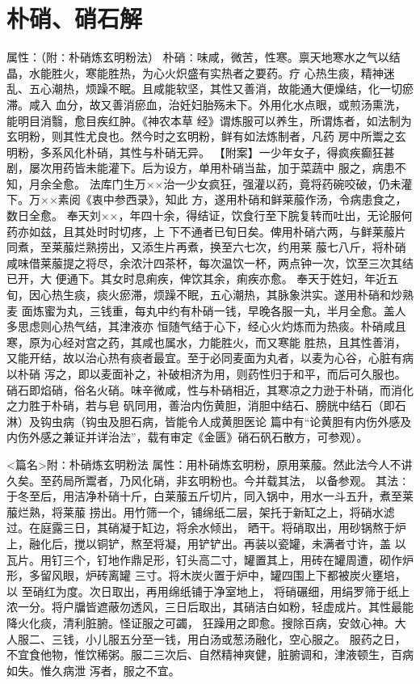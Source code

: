 \documentclass[a4paper,12pt,UTF8,twoside]{ctexbook}
\begin{document}
\chapter{朴硝、硝石解}
属性：（附∶朴硝炼玄明粉法） 
朴硝∶味咸，微苦，性寒。禀天地寒水之气以结晶，水能胜火，寒能胜热，为心火炽盛有实热者之要药。疗 
心热生痰，精神迷乱、五心潮热，烦躁不眠。且咸能软坚，其性又善消，故能通大便燥结，化一切瘀滞。咸入 
血分，故又善消瘀血，治妊妇胎殇未下。外用化水点眼，或煎汤熏洗，能明目消翳，愈目疾红肿。《神农本草 
经》谓炼服可以养生，所谓炼者，如法制为玄明粉，则其性尤良也。然今时之玄明粉，鲜有如法炼制者，凡药 
房中所鬻之玄明粉，多系风化朴硝，其性与朴硝无异。 
【附案】一少年女子，得疯疾癫狂甚剧，屡次用药皆未能灌下。后为设方，单用朴硝当盐，加于菜蔬中 
服之，病患不知，月余全愈。 
法库门生万××治一少女疯狂，强灌以药，竟将药碗咬破，仍未灌下。万××素阅《衷中参西录》，知此 
方，遂用朴硝和鲜莱菔作汤，令病患食之，数日全愈。 
奉天刘××，年四十余，得结证，饮食行至下脘复转而吐出，无论服何药亦如兹，且其处时时切疼，上 
下不通者已旬日矣。俾用朴硝六两，与鲜莱菔片同煮，至莱菔烂熟捞出，又添生片再煮，换至六七次，约用莱 
菔七八斤，将朴硝咸味借莱菔提之将尽，余浓汁四茶杯，每次温饮一杯，两点钟一次，饮至三次其结已开，大 
便通下。其女时息痢疾，俾饮其余，痢疾亦愈。 
奉天于姓妇，年近五旬，因心热生痰，痰火瘀滞，烦躁不眠，五心潮热，其脉象洪实。遂用朴硝和炒熟麦 
面炼蜜为丸，三钱重，每丸中约有朴硝一钱，早晚各服一丸，半月全愈。盖人多思虑则心热气结，其津液亦 
恒随气结于心下，经心火灼炼而为热痰。朴硝咸且寒，原为心经对宫之药，其咸也属水，力能胜火，而又寒能 
胜热，且其性善消，又能开结，故以治心热有痰者最宜。至于必同麦面为丸者，以麦为心谷，心脏有病以朴硝 
泻之，即以麦面补之，补破相济为用，则药性归于和平，而后可久服也。 
硝石即焰硝，俗名火硝。味辛微咸，性与朴硝相近，其寒凉之力逊于朴硝，而消化之力胜于朴硝，若与皂 
矾同用，善治内伤黄胆，消胆中结石、膀胱中结石（即石淋）及钩虫病（钩虫及胆石病，皆能令人成黄胆医论 
篇中有“论黄胆有内伤外感及内伤外感之兼证并详治法”，载有审定《金匮》硝石矾石散方，可参观）。 


<篇名>附∶朴硝炼玄明粉法
属性：用朴硝炼玄明粉，原用莱菔。然此法今人不讲久矣。至药局所鬻者，乃风化硝，非玄明粉也。今并载其法， 
以备参观。 
其法∶于冬至后，用洁净朴硝十斤，白莱菔五斤切片，同入锅中，用水一斗五升，煮至莱菔烂熟，将莱菔 
捞出。用竹筛一个，铺绵纸二层，架托于新缸之上，将硝水滤过。在庭露三日，其硝凝于缸边，将余水倾出， 
晒干。将硝取出，用砂锅熬于炉上，融化后，搅以铜铲，熬至将凝，用铲铲出。再装以瓷罐，未满者寸许，盖 
以瓦片。用钉三个，钉地作鼎足形，钉头高二寸，罐置其上，用砖在罐周遭，砌作炉形，多留风眼，炉砖离罐 
三寸。将木炭火置于炉中，罐四围上下都被炭火壅培，以 至硝红为度。次日取出，再用绵纸铺于净室地上， 
将硝碾细，用绢罗筛于纸上浓一分。将户牖皆遮蔽勿透风，三日后取出，其硝洁白如粉，轻虚成片。其性最能 
降火化痰，清利脏腑。怪证服之可蠲， 
狂躁用之即愈。搜除百病，安敛心神。大人服二、三钱，小儿服五分至一钱，用白汤或葱汤融化，空心服之。 
服药之日，不宜食他物，惟饮稀粥。服二三次后、自然精神爽健，脏腑调和，津液顿生，百病如失。惟久病泄 
泻者，服之不宜。 
\end{document}
